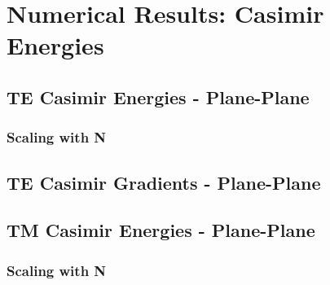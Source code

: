 \section{Numerical Results: Casimir Energies}

\subsection{TE Casimir Energies - Plane-Plane}


\subsubsection{Scaling with N}


\subsection{TE Casimir Gradients - Plane-Plane}




\subsection{TM Casimir Energies - Plane-Plane}

\subsubsection{Scaling with N}


    






